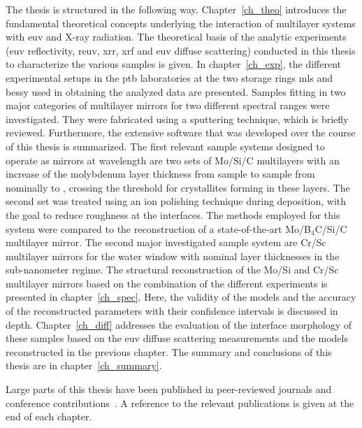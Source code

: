 The thesis is structured in the following way.
Chapter~\ref{ch_theo} introduces the fundamental theoretical concepts underlying
the interaction of multilayer systems with \gls{euv} and X-ray radiation.
The theoretical basis of the analytic experiments (\gls{euv} reflectivity,
\gls{reuv}, \gls{xrr}, \gls{xrf} and \gls{euv} diffuse scattering) conducted in
this thesis to characterize the various samples is given.
In chapter~\ref{ch_exp}, the different experimental setups in the \gls{ptb}
laboratories at the two storage rings \gls{mls} and \gls{bessy} used in
obtaining the analyzed data are presented.
Samples fitting in two major categories of multilayer mirrors for two different
spectral ranges were investigated.
They were fabricated using a sputtering technique, which is briefly reviewed.
Furthermore, the extensive software that was developed over the course of this
thesis is summarized.
The first relevant sample systems designed to operate as mirrors at 
wavelength are two sets of Mo/Si/C multilayers with an increase of the
molybdenum layer thickness from sample to sample from nominally  to
, crossing the threshold for crystallites forming in these layers.
The second set was treated using an ion polishing technique during deposition,
with the goal to reduce roughness at the interfaces.
The methods employed for this system were compared to the reconstruction of a
state-of-the-art Mo/B$_4$C/Si/C multilayer mirror.
The second major investigated sample system are Cr/Sc multilayer mirrors for the
water window with nominal layer thicknesses in the sub-nanometer regime.
The structural reconstruction of the Mo/Si and Cr/Sc multilayer mirrors based on
the combination of the different experiments is presented in
chapter~\ref{ch_spec}.
Here, the validity of the models and the accuracy of the reconstructed
parameters with their confidence intervals is discussed in depth.
Chapter~\ref{ch_diff} addresses the evaluation of the interface morphology of
these samples based on the \gls{euv} diffuse scattering measurements and the
models reconstructed in the previous chapter.
The summary and conclusions of this thesis are in chapter~\ref{ch_summary}.

Large parts of this thesis have been published in peer-reviewed journals and
conference contributions~\cite{haase_role_2014, haase_characterization_2015,
haase_multiparameter_2016, haase_interface_2017}.
A reference to the relevant publications is given at the end of each chapter.
